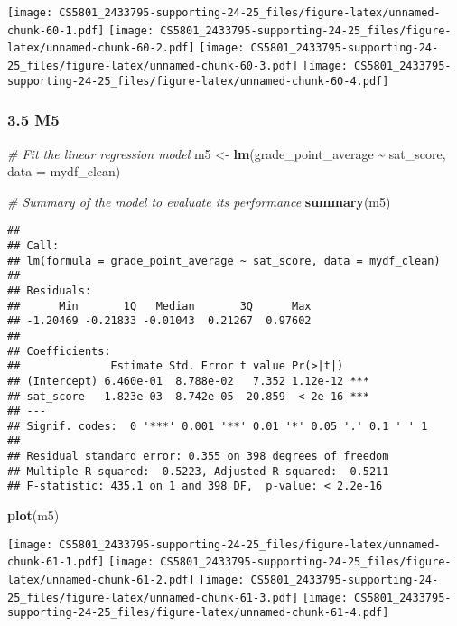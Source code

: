\documentclass[
]{article}
\newenvironment{Shaded}{\begin{snugshade}}{\end{snugshade}}
\newcommand{\AttributeTok}[1]{\textcolor[rgb]{0.13,0.29,0.53}{#1}}
\newcommand{\CommentTok}[1]{\textcolor[rgb]{0.56,0.35,0.01}{\textit{#1}}}
\newcommand{\FunctionTok}[1]{\textcolor[rgb]{0.13,0.29,0.53}{\textbf{#1}}}
\newcommand{\NormalTok}[1]{#1}
\newcommand{\OtherTok}[1]{\textcolor[rgb]{0.56,0.35,0.01}{#1}}
\newcommand{\SpecialCharTok}[1]{\textcolor[rgb]{0.81,0.36,0.00}{\textbf{#1}}}
\begin{document}
\texttt{[image: CS5801\_2433795-supporting-24-25\_files/figure-latex/unnamed-chunk-60-1.pdf]}
\texttt{[image: CS5801\_2433795-supporting-24-25\_files/figure-latex/unnamed-chunk-60-2.pdf]}
\texttt{[image: CS5801\_2433795-supporting-24-25\_files/figure-latex/unnamed-chunk-60-3.pdf]}
\texttt{[image: CS5801\_2433795-supporting-24-25\_files/figure-latex/unnamed-chunk-60-4.pdf]}

\subsubsection{3.5 M5}\label{m5}

\begin{Shaded}
\begin{Highlighting}[]
\CommentTok{\# Fit the linear regression model}
\NormalTok{m5 }\OtherTok{\textless{}{-}} \FunctionTok{lm}\NormalTok{(grade\_point\_average }\SpecialCharTok{\textasciitilde{}}\NormalTok{ sat\_score, }\AttributeTok{data =}\NormalTok{ mydf\_clean)}

\CommentTok{\# Summary of the model to evaluate its performance}
\FunctionTok{summary}\NormalTok{(m5)}
\end{Highlighting}
\end{Shaded}

\begin{verbatim}
## 
## Call:
## lm(formula = grade_point_average ~ sat_score, data = mydf_clean)
## 
## Residuals:
##      Min       1Q   Median       3Q      Max 
## -1.20469 -0.21833 -0.01043  0.21267  0.97602 
## 
## Coefficients:
##              Estimate Std. Error t value Pr(>|t|)    
## (Intercept) 6.460e-01  8.788e-02   7.352 1.12e-12 ***
## sat_score   1.823e-03  8.742e-05  20.859  < 2e-16 ***
## ---
## Signif. codes:  0 '***' 0.001 '**' 0.01 '*' 0.05 '.' 0.1 ' ' 1
## 
## Residual standard error: 0.355 on 398 degrees of freedom
## Multiple R-squared:  0.5223, Adjusted R-squared:  0.5211 
## F-statistic: 435.1 on 1 and 398 DF,  p-value: < 2.2e-16
\end{verbatim}

\begin{Shaded}
\begin{Highlighting}[]
\FunctionTok{plot}\NormalTok{(m5)}
\end{Highlighting}
\end{Shaded}

\texttt{[image: CS5801\_2433795-supporting-24-25\_files/figure-latex/unnamed-chunk-61-1.pdf]}
\texttt{[image: CS5801\_2433795-supporting-24-25\_files/figure-latex/unnamed-chunk-61-2.pdf]}
\texttt{[image: CS5801\_2433795-supporting-24-25\_files/figure-latex/unnamed-chunk-61-3.pdf]}
\texttt{[image: CS5801\_2433795-supporting-24-25\_files/figure-latex/unnamed-chunk-61-4.pdf]}
\end{document}
